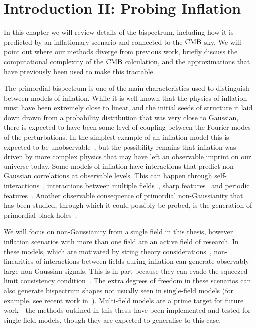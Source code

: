 %
\chapter{Introduction II: Probing Inflation}\label{chapter:intro_bispectra}
In this chapter we will review details of the bispectrum, including how it is predicted
by an inflationary scenario and connected to the $\text{CMB}$ sky.
We will point out where our methods diverge from previous work,
briefly discuss the computational complexity of the $\text{CMB}$ calculation, and
the approximations that have previously been used to make this tractable.


The primordial bispectrum is one of the main
characteristics used to distinguish between models of inflation. While it is well
known that the physics of inflation must have been extremely close
to linear, and the initial seeds of structure it laid down
drawn from a probability distribution that was
very close to Gaussian, there is expected to have been some level of coupling
between the Fourier modes of the perturbations.
In the simplest example of an inflation model this is
expected to be unobservable~\cite{Maldacena},
but the possibility remains that inflation was driven by
more complex physics that may have left an observable imprint on our universe today.
Some models of inflation have interactions that predict non-Gaussian
correlations at observable levels. This can happen through
self-interactions~\cite{px_burrage,dbi_in_the_sky},
interactions between multiple fields~\cite{Byrnes_2010, Gao_turn,
achucarro_multifield1, achucarro_multifield2, achucarro_robust_16, achucarro_natural,
achucarro_quad_viability, achucarro_gsr_cs_14, achucarro_cs_reduction_13,
achucarro_gong_cs_corr, achucarro_cs_12, achucarro_eft, curvaton_comprehensive},
sharp features~\cite{adshead, gsr, step_novaes}
and periodic features~\cite{flauger_pajer_resonant, Pajer_2013, Meerburg_2012, Meerburg_osc, Meerburg_2010,
Barnaby_2011, Peiris_2013, Easther_2013, Cabass_2018, Behbahani_2011}.
Another observable consequence of primordial non-Gaussianity
that has been studied,
through which it could possibly be probed, is the generation of primordial black
holes~\cite{pbh_byrnes, pbh_young, pbh_franciolini, pbh_passaglia}.


We will focus on non-Gaussianity from a single field in this thesis,
however inflation scenarios with more than one field are an
active field of research.
In these models, which are motivated by string theory considerations~\cite{achucarro_multifield1},
non-linearities of interactions between fields during inflation
can generate observably large non-Gaussian signals.
This is in part because they can evade the squeezed limit consistency condition~\cite{sqz_consistency}.
The extra degrees of freedom in these scenarios can also generate bispectrum shapes not usually
seen in single-field models (for example, see recent work in~\cite{RP_2, Fumagalli_2019}).
Multi-field models are a prime target for future work---the
methods outlined in this thesis have been implemented
and tested for single-field models,
though they are expected to generalise to this case.


